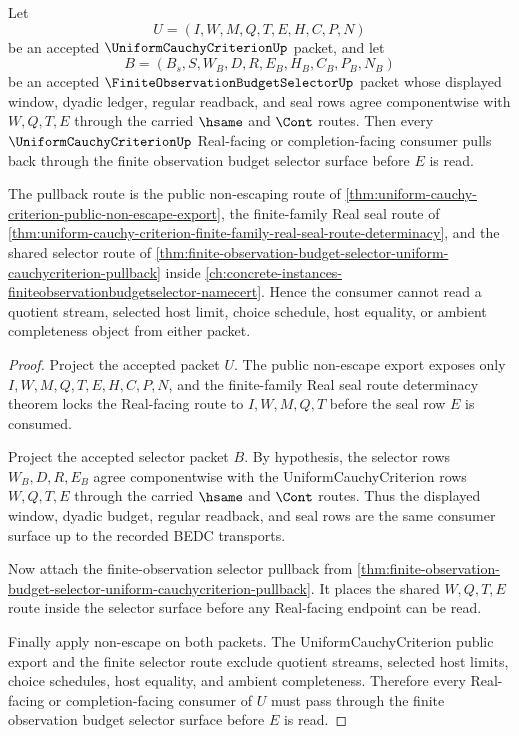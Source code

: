 \begin{theorem}
\label{thm:uniform-cauchy-criterion-finite-observation-budget-pullback}
Let
$$
U=(I,W,M,Q,T,E,H,C,P,N)
$$
be an accepted $\UniformCauchyCriterionUp$ packet, and let
$$
B=(B_s,S,W_B,D,R,E_B,H_B,C_B,P_B,N_B)
$$
be an accepted $\FiniteObservationBudgetSelectorUp$ packet whose displayed window, dyadic ledger, regular readback, and seal rows agree componentwise with $W,Q,T,E$ through the carried $\hsame$ and $\Cont$ routes. Then every $\UniformCauchyCriterionUp$ Real-facing or completion-facing consumer pulls back through the finite observation budget selector surface before $E$ is read.

The pullback route is the public non-escaping route of \autoref{thm:uniform-cauchy-criterion-public-non-escape-export}, the finite-family Real seal route of \autoref{thm:uniform-cauchy-criterion-finite-family-real-seal-route-determinacy}, and the shared selector route of \autoref{thm:finite-observation-budget-selector-uniform-cauchycriterion-pullback} inside \autoref{ch:concrete-instances-finiteobservationbudgetselector-namecert}. Hence the consumer cannot read a quotient stream, selected host limit, choice schedule, host equality, or ambient completeness object from either packet.
\end{theorem}
\begin{proof}
Project the accepted packet $U$. The public non-escape export exposes only $I,W,M,Q,T,E,H,C,P,N$, and the finite-family Real seal route determinacy theorem locks the Real-facing route to $I,W,M,Q,T$ before the seal row $E$ is consumed.

Project the accepted selector packet $B$. By hypothesis, the selector rows $W_B,D,R,E_B$ agree componentwise with the UniformCauchyCriterion rows $W,Q,T,E$ through the carried $\hsame$ and $\Cont$ routes. Thus the displayed window, dyadic budget, regular readback, and seal rows are the same consumer surface up to the recorded BEDC transports.

Now attach the finite-observation selector pullback from \autoref{thm:finite-observation-budget-selector-uniform-cauchycriterion-pullback}. It places the shared $W,Q,T,E$ route inside the selector surface before any Real-facing endpoint can be read.

Finally apply non-escape on both packets. The UniformCauchyCriterion public export and the finite selector route exclude quotient streams, selected host limits, choice schedules, host equality, and ambient completeness. Therefore every Real-facing or completion-facing consumer of $U$ must pass through the finite observation budget selector surface before $E$ is read.
\end{proof}

